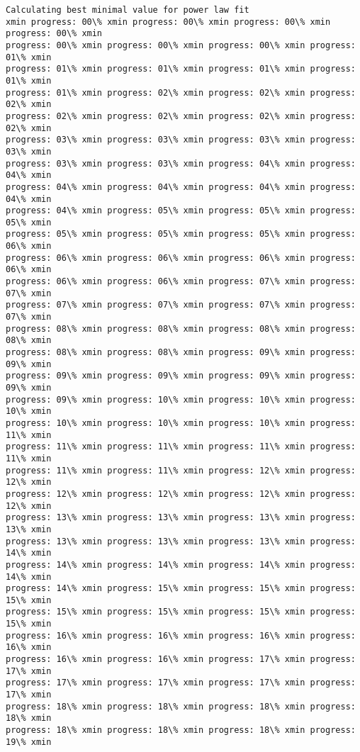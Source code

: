 \documentclass[11pt]{article}
\begin{document}
    \begin{Verbatim}[commandchars=\\\{\}]
Calculating best minimal value for power law fit
xmin progress: 00\% xmin progress: 00\% xmin progress: 00\% xmin progress: 00\% xmin
progress: 00\% xmin progress: 00\% xmin progress: 00\% xmin progress: 01\% xmin
progress: 01\% xmin progress: 01\% xmin progress: 01\% xmin progress: 01\% xmin
progress: 01\% xmin progress: 02\% xmin progress: 02\% xmin progress: 02\% xmin
progress: 02\% xmin progress: 02\% xmin progress: 02\% xmin progress: 02\% xmin
progress: 03\% xmin progress: 03\% xmin progress: 03\% xmin progress: 03\% xmin
progress: 03\% xmin progress: 03\% xmin progress: 04\% xmin progress: 04\% xmin
progress: 04\% xmin progress: 04\% xmin progress: 04\% xmin progress: 04\% xmin
progress: 04\% xmin progress: 05\% xmin progress: 05\% xmin progress: 05\% xmin
progress: 05\% xmin progress: 05\% xmin progress: 05\% xmin progress: 06\% xmin
progress: 06\% xmin progress: 06\% xmin progress: 06\% xmin progress: 06\% xmin
progress: 06\% xmin progress: 06\% xmin progress: 07\% xmin progress: 07\% xmin
progress: 07\% xmin progress: 07\% xmin progress: 07\% xmin progress: 07\% xmin
progress: 08\% xmin progress: 08\% xmin progress: 08\% xmin progress: 08\% xmin
progress: 08\% xmin progress: 08\% xmin progress: 09\% xmin progress: 09\% xmin
progress: 09\% xmin progress: 09\% xmin progress: 09\% xmin progress: 09\% xmin
progress: 09\% xmin progress: 10\% xmin progress: 10\% xmin progress: 10\% xmin
progress: 10\% xmin progress: 10\% xmin progress: 10\% xmin progress: 11\% xmin
progress: 11\% xmin progress: 11\% xmin progress: 11\% xmin progress: 11\% xmin
progress: 11\% xmin progress: 11\% xmin progress: 12\% xmin progress: 12\% xmin
progress: 12\% xmin progress: 12\% xmin progress: 12\% xmin progress: 12\% xmin
progress: 13\% xmin progress: 13\% xmin progress: 13\% xmin progress: 13\% xmin
progress: 13\% xmin progress: 13\% xmin progress: 13\% xmin progress: 14\% xmin
progress: 14\% xmin progress: 14\% xmin progress: 14\% xmin progress: 14\% xmin
progress: 14\% xmin progress: 15\% xmin progress: 15\% xmin progress: 15\% xmin
progress: 15\% xmin progress: 15\% xmin progress: 15\% xmin progress: 15\% xmin
progress: 16\% xmin progress: 16\% xmin progress: 16\% xmin progress: 16\% xmin
progress: 16\% xmin progress: 16\% xmin progress: 17\% xmin progress: 17\% xmin
progress: 17\% xmin progress: 17\% xmin progress: 17\% xmin progress: 17\% xmin
progress: 18\% xmin progress: 18\% xmin progress: 18\% xmin progress: 18\% xmin
progress: 18\% xmin progress: 18\% xmin progress: 18\% xmin progress: 19\% xmin

\end{Verbatim}
\end{document}
